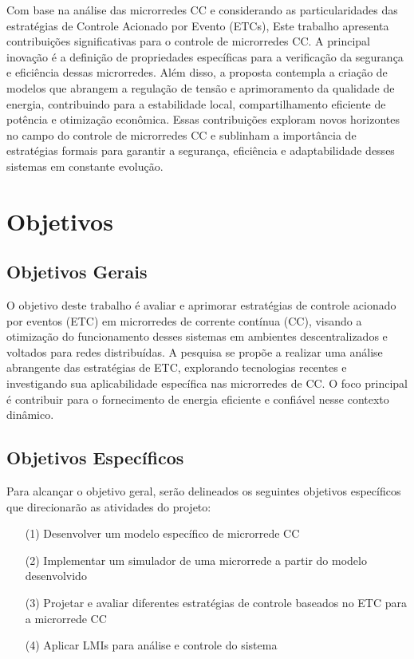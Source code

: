 
Com base na análise das microrredes CC e considerando as particularidades das estratégias de Controle Acionado por Evento (ETCs), Este trabalho apresenta contribuições significativas  para o controle de microrredes CC. A principal inovação é a definição de propriedades específicas para a verificação da segurança e eficiência dessas microrredes. Além disso, a proposta contempla a criação de modelos que abrangem a regulação de tensão e aprimoramento da qualidade de energia, contribuindo para a estabilidade local, compartilhamento eficiente de potência e otimização econômica. Essas contribuições exploram novos horizontes no campo do controle de microrredes CC e sublinham a importância de estratégias formais para garantir a segurança, eficiência e adaptabilidade desses sistemas em constante evolução.


\section{Objetivos}

\subsection{Objetivos Gerais}

O objetivo deste trabalho é avaliar e aprimorar estratégias de controle acionado por eventos (ETC) em microrredes de corrente contínua (CC), visando a otimização do funcionamento desses sistemas em ambientes descentralizados e voltados para redes distribuídas. A pesquisa se propõe a realizar uma análise abrangente das estratégias de ETC, explorando tecnologias recentes e investigando sua aplicabilidade específica nas microrredes de CC. O foco principal é contribuir para o fornecimento de energia eficiente e confiável nesse contexto dinâmico.

\subsection{Objetivos Específicos}
Para alcançar o objetivo geral, serão delineados os seguintes objetivos específicos que direcionarão as atividades do projeto:

\begin{enumerate}
	\item[(1)] Desenvolver um modelo específico de microrrede CC
	\item[(2)] Implementar um simulador de uma microrrede a partir do modelo desenvolvido
	\item[(3)] Projetar e avaliar diferentes estratégias de controle baseados no ETC para a microrrede CC
	\item[(4)] Aplicar LMIs para análise e controle do sistema
\end{enumerate}

